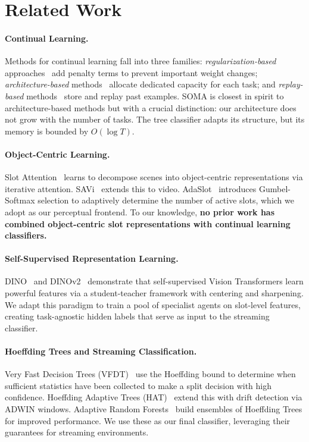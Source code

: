 \documentclass{article}
\begin{document}
\section{Related Work}
\label{sec:related}

\paragraph{Continual Learning.}
Methods for continual learning fall into three families:
\textit{regularization-based} approaches~\citep{kirkpatrick2017overcoming, zenke2017continual} add penalty terms to prevent important weight changes;
\textit{architecture-based} methods~\citep{rusu2016progressive, serra2018overcoming} allocate dedicated capacity for each task;
and \textit{replay-based} methods~\citep{rebuffi2017icarl, chaudhry2019tiny, buzzega2020dark} store and replay past examples.
SOMA is closest in spirit to architecture-based methods but with a crucial distinction: our architecture does not grow with the number of tasks. The tree classifier adapts its structure, but its memory is bounded by $O(\log T)$.

\paragraph{Object-Centric Learning.}
Slot Attention~\citep{locatello2020object} learns to decompose scenes into object-centric representations via iterative attention.
SAVi~\citep{kipf2022conditional} extends this to video.
AdaSlot~\citep{fan2024adaptive} introduces Gumbel-Softmax selection to adaptively determine the number of active slots, which we adopt as our perceptual frontend.
To our knowledge, \textbf{no prior work has combined object-centric slot representations with continual learning classifiers.}

\paragraph{Self-Supervised Representation Learning.}
DINO~\citep{caron2021emerging} and DINOv2~\citep{oquab2024dinov2} demonstrate that self-supervised Vision Transformers learn powerful features via a student-teacher framework with centering and sharpening.
We adapt this paradigm to train a pool of specialist agents on slot-level features, creating task-agnostic hidden labels that serve as input to the streaming classifier.

\paragraph{Hoeffding Trees and Streaming Classification.}
Very Fast Decision Trees (VFDT)~\citep{domingos2000mining} use the Hoeffding bound to determine when sufficient statistics have been collected to make a split decision with high confidence.
Hoeffding Adaptive Trees (HAT)~\citep{bifet2009adaptive} extend this with drift detection via ADWIN windows.
Adaptive Random Forests~\citep{gomes2017adaptive} build ensembles of Hoeffding Trees for improved performance.
We use these as our final classifier, leveraging their guarantees for streaming environments.
\end{document}
